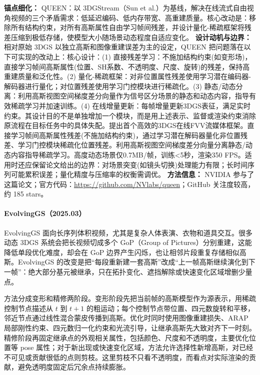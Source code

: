 \textbf{锚点细化：} QUEEN：以 3DGStream（Sun et al.）为基线，解决在线流式自由视角视频的三个矛盾需求：低延迟编码、低内存带宽、高重建质量。核心改动是：移除所有结构约束，对所有高斯属性自由学习帧间残差，并设计量化-稀疏框架将残差压缩到极低存储，使模型大小随场景动态程度自适应变化。
\textbf{设计动机与边界：} 相对原始 3DGS 以独立高斯和图像重建误差为主的设定，QUEEN 把问题落在以下可实现的改动上：核心设计：(1) 直接残差学习：不施加结构约束(如变形场)，直接学习帧间高斯属性(位置、SH系数、不透明度、尺度、旋转)的残差，保持高重建质量和泛化性。(2) 量化-稀疏框架：对非位置属性残差使用学习潜在编码器-解码器进行量化；对位置残差使用学习门控模块进行稀疏化。(3) 静态/动态分离：利用高斯视图空间梯度差分向量作为信号区分场景的静态和动态内容，指导有效稀疏学习并加速训练。(4) 在线增量更新：每帧增量更新3DGS表征，满足实时约束。其设计目的不是单独增加一个模块，而是用上述表示、监督或渲染约束消除原流程在目标任务中的具体失配。提出首个高效的3DGS在线FVV流媒体框架。直接学习帧间高斯属性残差(不施加结构约束)，通过学习潜在解码器量化非位置残差、学习门控模块稀疏化位置残差。利用高斯视图空间梯度差分向量分离静态/动态内容指导稀疏学习。高度动态场景仅0.7MB/帧，训练<5秒，渲染350 FPS。适用时还应保留论文给出的边界：对场景突变(如镜头切换)处理能力有限；长时间序列可能累积误差；量化精度与压缩率的权衡需调优。
\textbf{方法信息：} NVIDIA 参与了这篇论文；官方代码：\url{https://github.com/NVlabs/queen}；GitHub 关注度较高，约 185 stars。



\paragraph{EvolvingGS（2025.03）\cite{2503_05162}}
EvolvingGS 面向长序列体积视频，尤其是复杂人体表演、衣物和道具交互。很多动态 3DGS 系统会把长视频切成多个 GoP（Group of Pictures）分别重建，这能降低单段优化难度，却会在 GoP 边界产生闪烁，也让相邻片段重复存储相似高斯。EvolvingGS 的改变是把“每段重新建一套高斯”改成“上一帧高斯继续演化到下一帧”：绝大部分基元被继承，只在拓扑变化、遮挡解除或快速变化区域增删少量点。

方法分成变形和精修两阶段。变形阶段先把当前帧的高斯模型作为源表示，用稀疏控制节点描述从 $t$ 到 $t+1$ 的粗运动；每个控制节点带位置、四元数旋转和平移，邻近节点通过线性混合蒙皮传播到高斯。优化时同时使用图像重建损失、ARAP 局部刚性约束、四元数归一化约束和光流引导，让继承高斯先大致对齐下一时刻。精修阶段再固定继承点的外观相关属性，包括颜色、尺度和不透明度，主要优化位置等 pose 属性；对于新出现或快速变化区域，方法允许选择性新增高斯，对已经不可见或贡献很低的点则剪枝。这里剪枝不只看不透明度，而看点对实际渲染的贡献，避免透明度固定后冗余点持续膨胀。

